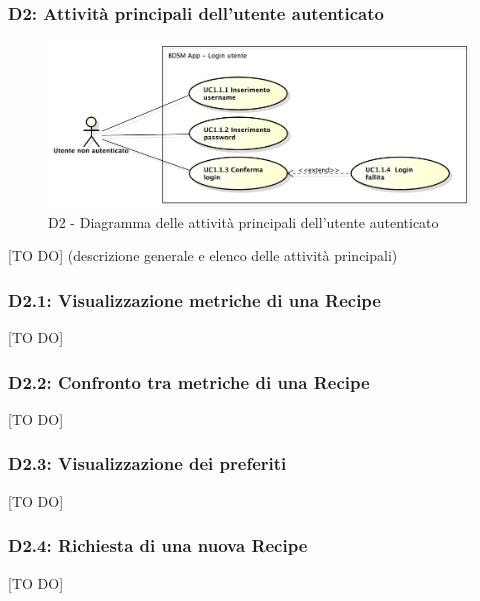 		\subsubsection{D2: Attività principali dell'utente autenticato} %
		\label{ssub:attivita_principali_dell_utente_autenticato}
		\begin{figure}[!htbp]
			\centering
			\centerline{\includegraphics[scale=0.45]{./images/UC1_1.pdf}}
			\caption{D2 - Diagramma delle attività principali dell'utente autenticato}
		\end{figure}
		[TO DO] (descrizione generale e elenco delle attività principali)


		\subsubsection{D2.1: Visualizzazione metriche di una Recipe} %
		\label{ssub:visualizzazione_metriche_di_una_recipe}
		[TO DO]

		\subsubsection{D2.2: Confronto tra metriche di una Recipe} %
		\label{ssub:confronto_tra_metriche_di_una_recipe}
		[TO DO]

		\subsubsection{D2.3: Visualizzazione dei preferiti} %
		\label{ssub:visualizzazione_dei_preferiti}
		[TO DO]

		\subsubsection{D2.4: Richiesta di una nuova Recipe} %
		\label{ssub:richiesta_di_una_nuova_recipe}
		[TO DO]

